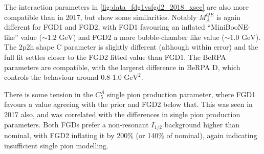 The interaction parameters in \autoref{fig:data_fdg1vsfgd2_2018_xsec} are also more compatible than in 2017, but show some similarities. Notably $M_A^{QE}$ is again different for FGD1 and FGD2, with FGD1 favouring an inflated ``MiniBooNE-like'' value ($\sim1.2\text{ GeV}$) and FGD2 a more bubble-chamber like value ($\sim1.0\text{ GeV}$). The 2p2h shape C parameter is slightly different (although within error) and the full fit settles closer to the FGD2 fitted value than FGD1. The BeRPA parameters are compatible, with the largerst difference in BeRPA D, which controls the behaviour around 0.8-1.0 $\text{GeV}^2$. 

There is some tension in the $C_5^A$ single pion production parameter, where FGD1 favours a value agreeing with the prior and FGD2 below that. This was seen in 2017 also, and was correlated with the differences in single pion production parameters. Both FGDs prefer a non-resonant $I_{1/2}$ background higher than nominal, with FGD2 inflating it by 200\% (or 140\% of nominal), again indicating insufficient single pion modelling.

